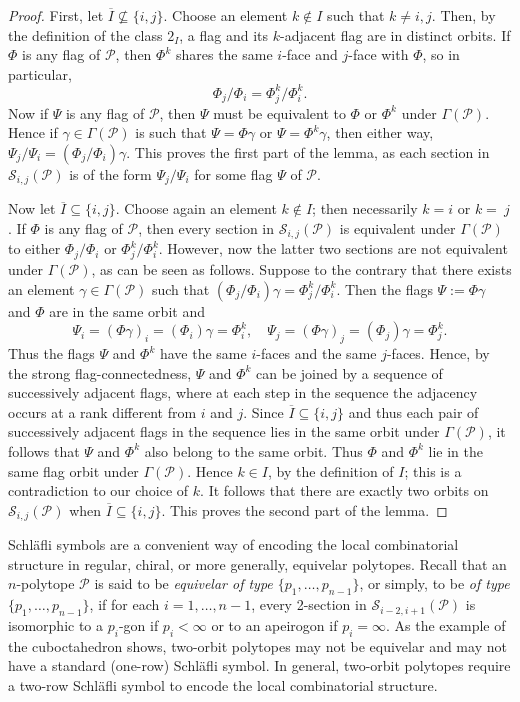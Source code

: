 \documentclass[12pt]{article}
\renewcommand{\bar}{\overline}
\renewcommand{\>}{\rangle}
\theoremstyle{definition}\newtheorem{definition}{Definition}[section]
\begin{document}
\begin{proof}
First, let $\bar{I} \not \subseteq \{i,j\}$. Choose an element $k\notin I$ such that $k\neq i,j$. Then, by the definition of the class $2_I$, a flag and its $k$-adjacent flag are in distinct orbits. If $\Phi$ is any flag of $\mathcal{P}$, then $\Phi^k$ shares the same $i$-face and $j$-face with $\Phi$, so in particular, 
\[\Phi_j / \Phi_i =\Phi^k_j / \Phi^k_i.\]
Now if $\Psi$ is any flag of $\mathcal{P}$, then $\Psi$ must be equivalent to $\Phi$ or $\Phi^k$ under $\Gamma(\mathcal{P})$. 
Hence if $\gamma \in \Gamma(\mathcal{P})$ is such that $\Psi=\Phi\gamma$ or $\Psi=\Phi^k\gamma$, then either way, $\Psi_j/\Psi_{i}=(\Phi_j/ \Phi_i)\gamma$.  This proves the first part of the lemma, as each section in $\mathcal{S}_{i,j}(\mathcal{P})$ is of the form $\Psi_j/\Psi_i$ for some flag $\Psi$ of $\mathcal{P}$. 

Now let $\bar{I} \subseteq \{i,j\}$. Choose again an element $k\notin I$; then necessarily $k=i$ or $k=~j$. If $\Phi$ is any flag of $\mathcal{P}$, then every section in $\mathcal{S}_{i,j}(\mathcal{P})$ is equivalent under $\Gamma(\mathcal{P})$ to either $\Phi_j / \Phi_i$ or $\Phi^k_j / \Phi^k_i$. However, now the latter two sections are not equivalent under $\Gamma(\mathcal{P})$, as can be seen as follows. Suppose to the contrary that there exists an element $\gamma\in\Gamma(\mathcal{P})$  such that $(\Phi_j / \Phi_i)\gamma=\Phi^k_j / \Phi^k_i$. Then the flags $\Psi:=\Phi\gamma$ and $\Phi$ are in the same orbit and 
\[\Psi_{i}=(\Phi\gamma)_{i} = (\Phi_i)\gamma=\Phi^k_i,\quad 
\Psi_{j}=(\Phi\gamma)_{j}=(\Phi_j)\gamma=\Phi^k_j.\] 
Thus the flags $\Psi$ and $\Phi^k$ have the same $i$-faces and the same $j$-faces. Hence, by the strong flag-connectedness, $\Psi$ and $\Phi^k$ can be joined by a sequence of successively adjacent flags, where at each step in the sequence the adjacency occurs at a rank different from $i$ and $j$. Since $\bar{I}\subseteq\{i,j\}$ and thus each pair of successively adjacent flags in the sequence lies in the same orbit under $\Gamma(\mathcal{P})$, it follows that $\Psi$ and $\Phi^k$ also belong to the same orbit. Thus $\Phi$ and $\Phi^k$ lie in the same flag orbit under $\Gamma(\mathcal{P})$. Hence $k\in I$, by the definition of $I$; this is a contradiction to our choice of $k$. It follows that there are exactly two orbits on $\mathcal{S}_{i,j}(\mathcal{P})$ when $\bar{I}\subseteq \{i,j\}$. This proves the second part of the lemma.
\end{proof}
\medskip

Schl\"afli symbols are a convenient way of encoding the local combinatorial structure in  regular, chiral, or more generally, equivelar polytopes. Recall that an $n$-polytope $\mathcal{P}$ is said to be \textit{equivelar of type $\{p_1,\ldots,p_{n-1}\}$}, or simply, to be \textit{of type $\{p_1,\ldots,p_{n-1}\}$}, if for each $i=1,\ldots,n-1$, every 2-section in $\mathcal{S}_{i-2,i+1}(\mathcal{P})$ is isomorphic to a $p_i$-gon if $p_i<\infty$ or to an apeirogon if $p_{i}=\infty$. As the example of the cuboctahedron shows, two-orbit polytopes may not be equivelar and may not have a standard (one-row) Schl\"afli symbol. In general, two-orbit polytopes require a two-row Schl\"afli symbol to encode the local combinatorial structure.
\end{document}
